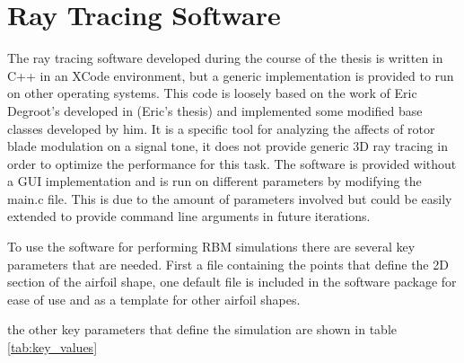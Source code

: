 \chapter{Ray Tracing Software}

The ray tracing software developed during the course of the thesis is written in C++ in an XCode environment, but a generic implementation is provided to run on other operating systems. This code is loosely based on the work of Eric Degroot's developed in (Eric's thesis) and implemented some modified base classes developed by him. It is a specific tool for analyzing the affects of rotor blade modulation on a signal tone, it does not provide generic 3D ray tracing in order to optimize the performance for this task. The software is provided without a GUI implementation and is run on different parameters by modifying the main.c file. This is due to the amount of parameters involved but could be easily extended to provide command line arguments in future iterations.

To use the software for performing RBM simulations there are several key parameters that are needed. First a file containing the points that define the 2D section of the airfoil shape, one default file is included in the software package for ease of use and as a template for other airfoil shapes.

the other key parameters that define the simulation are shown in table \ref{tab:key_values}

